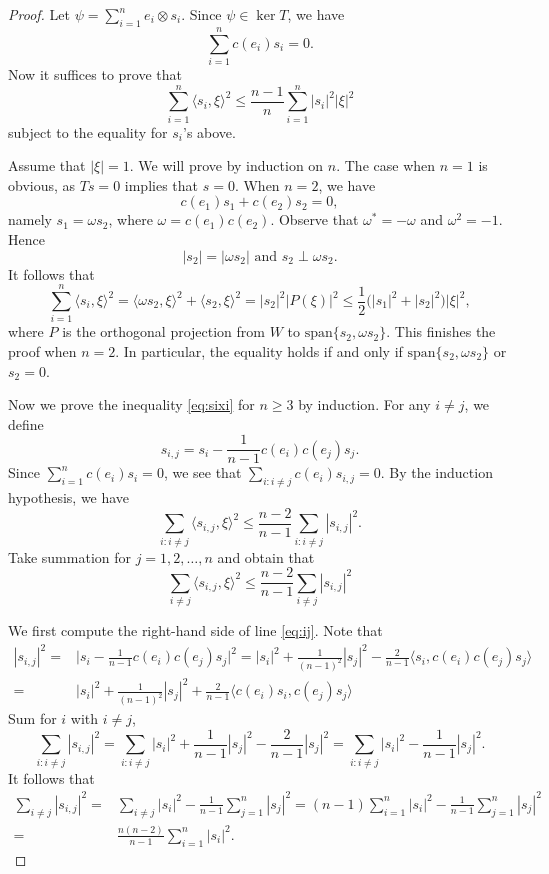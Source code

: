 \documentclass[12pt, reqno]{amsart}
\theoremstyle{plain}%
\theoremstyle{definition}
\theoremstyle{remark}
\numberwithin{equation}{section}
\begin{document}
\begin{proof}
	Let $\psi=\sum_{i=1}^n e_i\otimes s_i$. Since $\psi\in \ker T$, we have
	$$\sum_{i=1}^n c(e_i)s_i=0.$$
	Now it suffices to prove that
	\begin{equation}\label{eq:sixi}
		\sum_{i=1}^n\langle s_i,\xi\rangle^2\leq \frac{n-1}{n}\sum_{i=1}^n|s_i|^2|\xi|^2
	\end{equation}
	subject to the equality for $s_i$'s above.
	
	Assume that $|\xi|=1$. We will prove by induction on $n$. The case when $n=1$ is obvious, as $Ts=0$ implies that $s=0$. When $n=2$, we have
	$$c(e_1)s_1+c(e_2)s_2=0,$$
	namely $s_1=\omega s_2$, where $\omega=c(e_1)c(e_2)$. Observe that $\omega^*=-\omega$ and $\omega^2=-1$. Hence 
	\begin{equation}\label{eq:perp}
		|s_2|=|\omega s_2|\text{ and }s_2\perp\omega s_2.
	\end{equation} It follows that
	$$\sum_{i=1}^n\langle s_i,\xi\rangle^2=\langle\omega s_2,\xi\rangle^2+\langle s_2,\xi\rangle^2=|s_2|^2\Big|P(\xi)\Big|^2\leq \frac 1 2\Big(|s_1|^2+|s_2|^2\Big)|\xi|^2,$$
	where $P$ is the orthogonal projection from $W$ to $\text{span}\{s_2,\omega s_2\}$.
	This finishes the proof when $n=2$. In particular, the equality holds if and only if $\text{span}\{s_2,\omega s_2\}$ or $s_2=0$.
	
	Now we prove the inequality \eqref{eq:sixi} for $n\geq 3$ by induction. For any $i\ne j$, we define
	$$s_{i,j}=s_i-\frac{1}{n-1}c(e_i)c(e_j)s_j.$$
	Since $\sum_{i=1}^n c(e_i)s_i=0$, we see that $\sum_{i:i\ne j} c(e_i)s_{i,j}=0.$ By the induction hypothesis, we have
	$$\sum_{i:i\ne j}\langle s_{i,j},\xi\rangle^2\leq \frac{n-2}{n-1}\sum_{i:i\ne j}|s_{i,j}|^2.$$
	Take summation for $j=1,2,\ldots,n$ and obtain that
	\begin{equation}\label{eq:ij}
		\sum_{i\ne j}\langle s_{i,j},\xi\rangle^2\leq \frac{n-2}{n-1}\sum_{i\ne j}|s_{i,j}|^2
	\end{equation}
	
	We first compute the right-hand side of line \eqref{eq:ij}. Note that
	\begin{align*}
		|s_{i,j}|^2=&\Big|s_i-\frac{1}{n-1}c(e_i)c(e_j)s_j\Big|^2=|s_i|^2+\frac{1}{(n-1)^2}|s_j|^2-\frac{2}{n-1}\langle s_i,c(e_i)c(e_j)s_j\rangle\\
		=&|s_i|^2+\frac{1}{(n-1)^2}|s_j|^2+\frac{2}{n-1}\langle c(e_i)s_i,c(e_j)s_j\rangle
	\end{align*}
	Sum for $i$ with $i\ne j$,
	$$\sum_{i:i\ne j}|s_{i,j}|^2=\sum_{i:i\ne j}|s_i|^2+\frac{1}{n-1}|s_j|^2-\frac{2}{n-1}|s_j|^2=\sum_{i:i\ne j}|s_i|^2-\frac{1}{n-1}|s_j|^2.$$
	It follows that
	\begin{equation}\label{eq:rhs-ij}
		\begin{split}
			\sum_{i\ne j}|s_{i,j}|^2=&\sum_{i\ne j}|s_i|^2-\frac{1}{n-1}\sum_{j=1}^n|s_j|^2=(n-1)\sum_{i=1}^n|s_i|^2-\frac{1}{n-1}\sum_{j=1}^n|s_j|^2\\
			=&\frac{n(n-2)}{n-1}\sum_{i=1}^n|s_i|^2.
		\end{split}
	\end{equation}
	

\end{proof}
\end{document}
